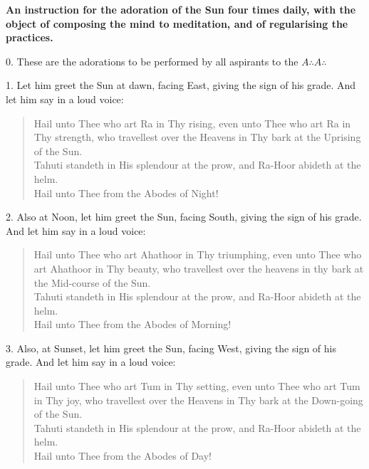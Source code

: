 
\textbf{An instruction for the adoration of the Sun four times daily, with the object of composing the mind to meditation, and of regularising the practices.}

0. These are the adorations to be performed by all aspirants to the $A\therefore{}A\therefore$

1. Let him greet the Sun at dawn, facing East, giving the sign of his grade. And let him say in a loud voice:

\begin{verse}
Hail unto Thee who art Ra in Thy rising, even unto Thee who art Ra in Thy strength, who travellest over the Heavens in Thy bark at the Uprising of the Sun.  \\
Tahuti standeth in His splendour at the prow, and Ra-Hoor abideth at the helm. \\
Hail unto Thee from the Abodes of Night!
\end{verse}

2. Also at Noon, let him greet the Sun, facing South, giving the sign of his grade. And let him say in a loud voice:

\begin{verse}
Hail unto Thee who art Ahathoor in Thy triumphing, even unto Thee who art Ahathoor in Thy beauty, who travellest over the heavens in thy bark at the Mid-course of the Sun. \\
Tahuti standeth in His splendour at the prow, and Ra-Hoor abideth at the helm. \\
Hail unto Thee from the Abodes of Morning!
\end{verse}

3. Also, at Sunset, let him greet the Sun, facing West, giving the sign of his grade. And let him say in a loud voice:
\begin{verse}
Hail unto Thee who art Tum in Thy setting, even unto Thee who art Tum in Thy joy, who travellest over the Heavens in Thy bark at the Down-going of the Sun. \\
Tahuti standeth in His splendour at the prow, and Ra-Hoor abideth at the helm. \\
Hail unto Thee from the Abodes of Day!
\end{verse}

